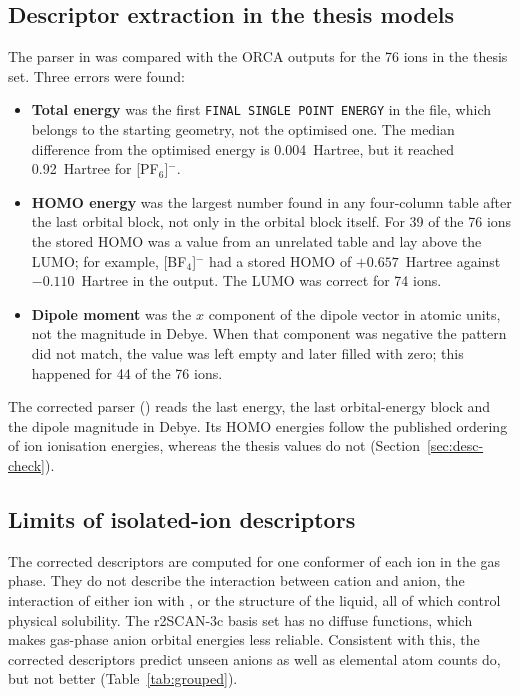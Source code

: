 \subsection{Descriptor extraction in the thesis models}
\label{sec:issue-desc}
The parser in  was compared with the ORCA outputs for the 76 ions in the thesis set. Three errors were found:
\begin{itemize}
    \item \textbf{Total energy} was the first \texttt{FINAL SINGLE POINT ENERGY} in the file, which belongs to the starting geometry, not the optimised one. The median difference from the optimised energy is 0.004~Hartree, but it reached 0.92~Hartree for [PF$_6$]$^-$.
    \item \textbf{HOMO energy} was the largest number found in any four-column table after the last orbital block, not only in the orbital block itself. For 39 of the 76 ions the stored HOMO was a value from an unrelated table and lay above the LUMO; for example, [BF$_4$]$^-$ had a stored HOMO of $+0.657$~Hartree against $-0.110$~Hartree in the output. The LUMO was correct for 74 ions.
    \item \textbf{Dipole moment} was the $x$ component of the dipole vector in atomic units, not the magnitude in Debye. When that component was negative the pattern did not match, the value was left empty and later filled with zero; this happened for 44 of the 76 ions.
\end{itemize}
The corrected parser () reads the last energy, the last orbital-energy block and the dipole magnitude in Debye. Its HOMO energies follow the published ordering of ion ionisation energies, whereas the thesis values do not (Section~\ref{sec:desc-check}).

\subsection{Limits of isolated-ion descriptors}
The corrected descriptors are computed for one conformer of each ion in the gas phase. They do not describe the interaction between cation and anion, the interaction of either ion with \co{}, or the structure of the liquid, all of which control physical solubility. The r2SCAN-3c basis set has no diffuse functions, which makes gas-phase anion orbital energies less reliable. Consistent with this, the corrected descriptors predict unseen anions as well as elemental atom counts do, but not better (Table~\ref{tab:grouped}).

